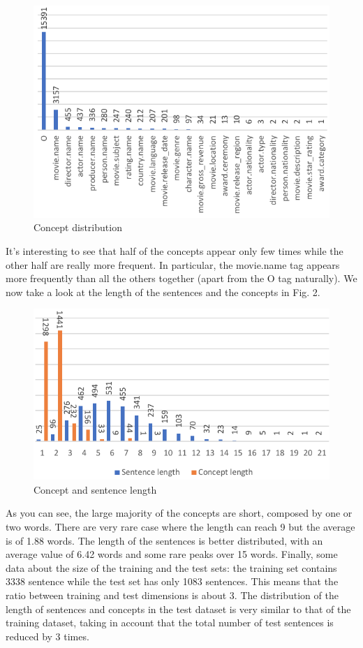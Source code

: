 \documentclass[11pt,a4paper]{article}
\begin{document}
\begin{figure}
  \includegraphics[scale=0.35]{concept_table.jpg}
  \caption{Concept distribution}
\end{figure}
It's interesting to see that half of the concepts appear only few times while the other half are really more frequent. In particular, the movie.name tag appears more frequently than all the others together (apart from the O tag naturally). We now take a look at the length of the sentences and the concepts in Fig. 2.
\begin{figure}
  \includegraphics[scale=0.33]{length.png}
  \caption{Concept and sentence length}
\end{figure}
As you can see, the large majority of the concepts are short, composed by one or two words. There are very rare case where the length can reach 9 but the average is of 1.88 words. The length of the sentences is better distributed, with an average value of 6.42 words and some rare peaks over 15 words. Finally, some data about the size of the training and the test sets: the training set contains 3338 sentence while the test set has only 1083 sentences. This means that the ratio between training and test dimensions is about 3. The distribution of the length of sentences and concepts in the test dataset is very similar to that of the training dataset, taking in account that the total number of test sentences is reduced by 3 times. 
\end{document}
